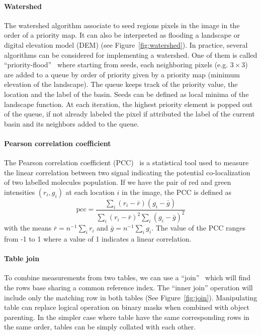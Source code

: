 \paragraph{Watershed} The watershed algorithm associate to seed regions pixels in the image in the order of a priority map. It can also be interpreted as flooding a landscape or digital elevation model (DEM) (see Figure~\ref{fig:watershed}). In practice, several algorithms can be considered for implementing a watershed. One of them is called ``priority-flood''~\cite{barnes2014} where starting from seeds, each neighboring pixels (e.g. $3 \times 3$) are added to a queue by order of priority given by a priority map (minimum elevation of the landscape). The queue keeps track of the priority value, the location and the label of the basin. Seeds can be defined as local minima of the landscape function. At each iteration, the highest priority element is popped out of the queue, if not already labeled the pixel if attributed the label of the current basin and its neighbors added to the queue.

\paragraph{Pearson correlation coefficient} The Pearson correlation coefficient (PCC)~\cite{pcc} is a statistical tool used to measure the linear correlation between two signal indicating the potential co-localization of two labelled molecules population. If we have the pair of red and green intensities $(r_i,g_i)$ at each location $i$ in the image, the PCC is defined as 
$$\mathrm{pcc} = \frac{\sum_i(r_i-\bar{r})(g_i-\bar{g})}{\sum_i(r_i-\bar{r})^2 \sum_i(g_i-\bar{g})^2}$$ 
with the means $\bar{r} = n^{-1}\sum_i r_i$ and $\bar{g} = n^{-1}\sum_i g_i$. The value of the PCC ranges from -1 to 1 where a value of 1 indicates a linear correlation.

\paragraph{Table join} To combine measurements from two tables, we can use a ``join''~\cite{join} which will find the  rows base sharing a common reference index. The ``inner join'' operation will include only the matching row in both tables (See Figure~\ref{fig:join}). Manipulating table can replace logical operation on binary masks when combined with object parenting. In the simpler case where table have the same corresponding rows in the same order, tables can be simply collated with each other.

